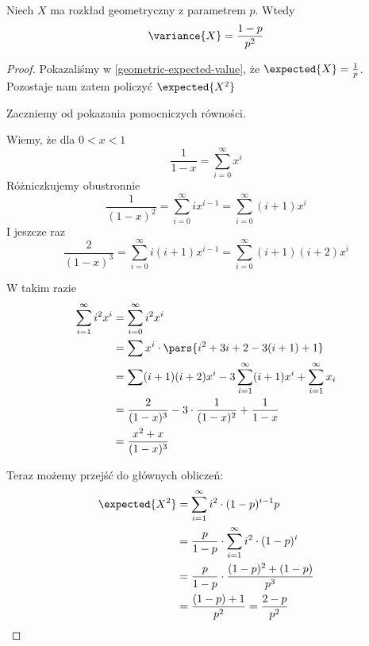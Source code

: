 \begin{theorem}
	\label{variance-of-geometric}
	Niech \( X \) ma rozkład geometryczny z parametrem \( p \). Wtedy
	\[
		\variance{X} = \frac{1 - p}{p^2}
	\]
\end{theorem}
\begin{proof}
	Pokazaliśmy w \ref{geometric-expected-value}, że \( \expected{X} = \frac{1}{p} \). Pozostaje nam zatem policzyć \( \expected{X^2} \)

	Zaczniemy od pokazania pomocniczych równości.

	Wiemy, że dla \( 0 < x < 1 \)
	\[
		\frac{1}{1-x} = \sum_{i=0}^\infty x^i
	\]
	Różniczkujemy obustronnie
	\[
		\frac{1}{(1-x)^2} = \sum_{i=0}^\infty i x^{i-1} = \sum_{i=0}^\infty (i+1)x^i
	\]
	I jeszcze raz
	\[
		\frac{2}{(1-x)^3} = \sum_{i=0}^\infty i (i+1) x^{i-1}
		= \sum_{i=0}^\infty (i+1)(i+2)x^i
	\]

	W takim razie
	\begin{align*}
		\sum_{i=1}^\infty i^2 x^i & = \sum_{i=0}^\infty i^2 x^i                                                \\
		                          & = \sum x^i \cdot \pars{i^2 + 3i + 2 - 3(i + 1) + 1}                        \\
		                          & = \sum (i+1)(i+2)x^i - 3\sum_{i=1}^\infty (i+1)x^i + \sum_{i=1}^\infty x_i \\
		                          & = \frac{2}{(1-x)^3} - 3\cdot\frac{1}{(1-x)^2} + \frac{1}{1-x}              \\
		                          & = \frac{x^2 + x}{(1-x)^3}
	\end{align*}

	Teraz możemy przejść do głównych obliczeń:
	\begin{align*}
		\expected{X^2}
		 & = \sum_{i=1}^\infty i^2 \cdot (1-p)^{i-1} p                 \\
		 & = \frac{p}{1 - p} \cdot \sum_{i=1}^\infty i^2 \cdot (1-p)^i \\
		 & = \frac{p}{1-p}\cdot\frac{(1-p)^2 + (1-p)}{p^3}             \\
		 & = \frac{(1-p) + 1}{p^2} = \frac{2 - p}{p^2}
	\end{align*}


\end{proof}
